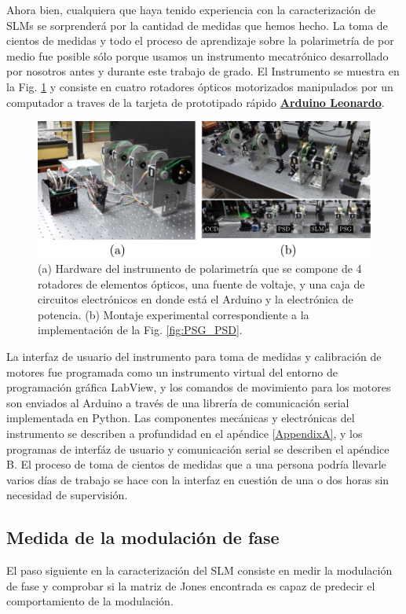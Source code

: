Ahora bien, cualquiera que haya tenido experiencia con la
caracterización de SLMs se sorprenderá por la cantidad de medidas que
hemos hecho. La toma de cientos de medidas y todo el proceso de
aprendizaje sobre la polarimetría de por medio fue posible sólo
porque usamos un instrumento mecatrónico desarrollado por nosotros
antes y durante este trabajo de grado. El Instrumento se muestra en la
Fig. \ref{fig:montaje_real_polarimetro} y consiste en
cuatro rotadores ópticos motorizados manipulados por un computador a
traves de la tarjeta de prototipado rápido
\href{http://www.arduino.cc/en/Main/ArduinoBoardLeonardo}{\bf{Arduino Leonardo}}. 
\begin{figure}[h!]
\centering
\includegraphics[scale=.91]{montaje_real_polarimetro.pdf}
\caption[Hardware del instrumento de polarimetría y montaje
experimental ]{(a) Hardware del instrumento de polarimetría que se
  compone de 4 rotadores de elementos ópticos, una fuente de voltaje,
  y una caja de circuitos electrónicos en donde está el Arduino y la
  electrónica de potencia. (b) Montaje experimental correspondiente a
  la implementación de la Fig. \ref{fig:PSG_PSD}. }
\label{fig:montaje_real_polarimetro}
\end{figure}
 La interfaz de usuario del instrumento para toma de medidas y
calibración de motores fue programada como un
instrumento virtual del entorno de programación gráfica LabView, y los
comandos de movimiento para los motores son enviados al Arduino a
través de una librería de comunicación serial implementada en Python.
Las componentes mecánicas y electrónicas del instrumento se describen a profundidad en el
apéndice \ref{AppendixA}, y los programas de interfáz de usuario y
comunicación serial se describen el apéndice B.
El proceso de toma de cientos de medidas que a una persona podría llevarle varios
días de trabajo se hace con la interfaz en cuestión de una o dos horas
sin necesidad de supervisión.    

\subsection{Medida de la modulación de fase}
El paso siguiente en la caracterización del SLM consiste en medir la
modulación de fase y comprobar si la matriz de Jones encontrada es
capaz de predecir el comportamiento de la modulación. 

